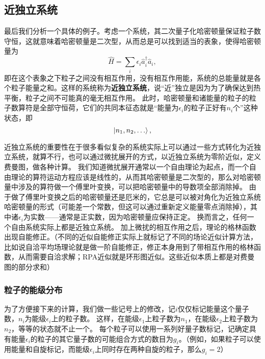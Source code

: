\documentclass[hyperref, UTF8, a4paper]{ctexart}
\begin{document}
\subsection{近独立系统}

最后我们分析一个具体的例子。考虑一个系统，其二次量子化哈密顿量保证粒子数守恒，这就意味着哈密顿量是二次型，从而总是可以找到适当的表象，使得哈密顿量为
\begin{equation}
    \hat{H} = \sum_i \epsilon_i \hat{a}_i^\dagger \hat{a}_i,
\end{equation}
即在这个表象之下粒子之间没有相互作用，没有相互作用能，系统的总能量就是各个粒子能量之和。这样的系统称为\textbf{近独立系统}，说“近”独立是因为为了确保达到热平衡，粒子之间不可能真的毫无相互作用。
此时，哈密顿量和诸能量的粒子的粒子数算符是全部守恒荷，它们的共同本征态就是“能量为$\epsilon_i$的粒子正好有$n_i$个”这种状态，即
\[
    \ket{n_1, n_2, \ldots},
\]

近独立系统的重要性在于很多看似复杂的系统实际上可以通过一些方式转化为近独立系统，就算不行，也可以通过微扰展开的方式，以近独立系统为零阶近似，定义费曼图，做各种计算。
我们知道微扰展开通常以一个自由理论为起点，而一个自由理论的算符运动方程应该是线性的，从而其哈密顿量是二次型的，那么对哈密顿量中涉及的算符做一个傅里叶变换，可以把哈密顿量中的导数项全部消除掉。
由于做了傅里叶变换之后的哈密顿量还是厄米的，它总是可以被对角化为近独立系统哈密顿量的形式（可能差一个常数，但这可以通过重新定义能量零点消除掉），其中诸$\epsilon_i$为实数——通常是正实数，因为哈密顿量应保持正定。
换而言之，任何一个自由系统实际上都是近独立系统。
加上微扰的相互作用之后，理论的格林函数出现自能修正。（不同的近似自能修正实际上就标记了不同的场论近似计算方法，比如说自洽平均场理论就是做一阶自能修正，修正本身用到了带相互作用的格林函数，从而需要自洽求解；RPA近似就是环形图近似。这些近似本质上都是对费曼图的部分求和）

\subsubsection{粒子的能级分布}

为了方便接下来的计算，我们做一些记号上的修改，记$i$仅仅标记能量这个量子数，$n_i$为能级$\epsilon_i$上的粒子数。
这样，在能级$\epsilon_1$上粒子数为$n_1$，在能级$\epsilon_2$上粒子数为$n_2$，等等的状态就不止一个。
每个粒子可以使用一系列好量子数标记，记确定具有能量$\epsilon_i$的粒子的其它量子数的可能组合方式的数目为$g_i$。（例如，如果粒子可以使用能量和自旋标记，而能级$\epsilon_i$上同时存在两种自旋的粒子，那么$g_i=2$）
\end{document}
